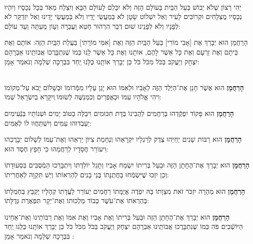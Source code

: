 \documentclass[twoside, openany, parskip=half, 11pt]{book}
\begin{document}
\begin{footnotesize}
\\
יְהִי רָצוֹן שֶׁלֹא יֵבוֹשׁ בַּעַל הַבַּיִת בָּעוֹלָם הַזֶּה וְלֹא יִכָּלֵם לָעוֹלָם הַבָּא וְיִצְלַח מְאֹד בְּכָל נְכָסָיו וְיִהְיוּ נְכָסָיו מֻצְלָחִים וּקְרוֹבִים לָעִיר וְאַל יִשְׁלוֹט שָׂטָן לֹא בְּמַעֲשֵׂי יָדָיו וְלֹא בְּמַעֲשֵׂי יָדֵינוּ וְאַל יִזְדַקֵּר לֹא לְפָנָיו וְלֹא לְפָנֵינוּ שׁוּם דְבַר הִרְהוּר חֵטְא וַעֲבֵרָה וְעָוֹן מֵעַתָּה וְעַד עוֹלָם:

\end{footnotesize}
 
הָרַחֲמָן הוּא יְבָרֵךְ אֶת [אָבִי מוֹרִי] בַּעַל הַבַּֽיִת הַזֶּה וְאֶת [אִמִּי מוֹרָתִי] בַּעֲלַת הַבַּֽיִת הַזֶּה: אוֹתָם וְאֶת בֵּיתָם וְאֶת זַרְעָם וְאֶת כָּל אַשֶׁר לָהֶם, אוֹתָנוּ וְאֶת כָּל אַשֶׁר לָֽנוּ כְּמוֹ שֶׁנִּתְבָּרֲכוּ אֲבוֹתֵֽינוּ אַבְרָהָם יִצְחָק וְיַעֲקֹב בַּכֹּל מִכֹּל כֹּל כֵּן יְבָרֵךְ אוֹתָֽנוּ כֻּלָּנוּ יַֽחַד בִּבְרָכָה שְׁלֵמָה וְנֹאמַר אָמֵן:

\begin{sometimes}

\\
	\textbf{הָרַחֲמָן}
	 הוּא אֲשֶׁר חָנַן אֶת־הַיֶּלֶד הַזֶּה לְאָבִיו וּלְאִמּוֹ הוּא יָגֵן עָלָיו מִמְּֿרוֹמוֹ וּבְשָׁלוֹם יָבֹא עַל־מְקוֹמוֹ וִיהִי אֱלֹהָיו עִמּוֹ וּכְאֶפְרַיִם וְכִמְנַשֶּׁה לְשׂוּמוֹ ְויִקָּרֵא בְיִשְׂרָאֵל שְׁמוֹ:
	 
	\textbf{הָרַחֲמָן}
	 הוּא פָּקוֹד יִפְקְֿדֵהוּ בְּרַחֲמִים לַהֲבִינוֹ בְּדָת חִכּוּמִים וִיבַלֶּה בַטּוֹב יָמִים וּשְׁנוֹתָיו בַּנְּֿעִימִים יַעַבְדוּהוּ עַמִּים וְיִשְׁתַּחֲווּ לוֹ לְאֻמִּים: 
	
	\textbf{הָרַחֲמָן}
	 הוּא רַבּוֹת שָׁנִים יְחַיֵּהוּ צֶדֶק לְרַגְלָיו יִקְרָאֵהוּ וְנֶחָמַת צִיּוֹן יַרְאֵהוּ וְאֶת־עַמּוֹ לְשָׁלוֹם יְבָרֲכֵהוּ וִיעוֹרֵר חֲסָדָיו לְרַחֲמֵהוּ כִּי חָפֵץ חֶסֶד הוּא: 
	
	\textbf{הָרַחֲמָן}
	 הוּא יְבָרֵךְ אֶת־הֶחָתָן הַזֶּה וּבַעַל בְּרִיתוֹ יִשְׂמַח אָבִיו וְתָגֵל יוֹלַדְתּוֹ וְיִתְבָּרַכוּ הַמְֿסֻבִּים בִּסְעוּדָתוֹ וְכֵן יִזְכּוּ שֶׁיִּשְׂמְֿחוּ בַּחֲתֻנָּתוֹ בְּנֵי בָנִים לְהַרְאוֹתוֹ וְיֵשׁ תִּקְוָה לְאַחֲרִיתוֹ: 
	
	\textbf{הָרַחֲמָן}
	 הוּא מְהֵרָה יִזְכֹּר זֹאת מִצְוָתוֹ בָּהּ יִפְדֶה אֲיֻמָּתוֹ רַחֲמִים יְעוֹרֵר לַעֲדָתוֹ קְהָלָיו יְקַבֵּץ בְּחֶמְלָתוֹ בְּהַרְאֹתוֹ אֶת־עֹשֶׁר כְּבוֹד מַלְכוּתוֹ וְאֶת־יְקָר תִּפְאֶרֶת גְּדֻלָּתוֹ: 
	
	\textbf{הָרַחֲמָן}
	 הוּא יְבָרֵךְ אֶת־הֶחָתָן הַזֶּה וּבַּעַל בְּרִיתוֹ וְאֶת אָבִיו וְאֶת אִמּוֹ וְאֶת רַבּוֹתֵינוּ וְאֶת־אַחֵינוּ הַיּוֹשְֿׁבִים פֹּה כְּמוֹ שֶׁנִתְבָּרֲכוּ אֲבוֹתֵֽינוּ אַבְרָהָם יִצְחָק וְיַעֲקֹב בַּכֹּל מִכֹּל כֹּל כֵּן יְבָרֵךְ אוֹתָֽנוּ כֻּלָּנוּ יַֽחַד בִּבְרָכָה שְׁלֵמָה וְנֹאמַר אָמֵן
	 :

\end{sometimes}
\end{document}
